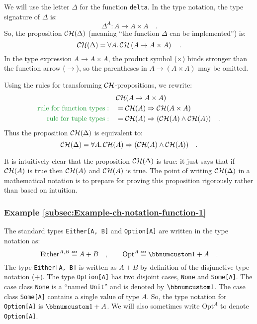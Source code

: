 We will use the letter $\Delta$ for the function \lstinline!delta!.
In the type notation, the type signature of $\Delta$ is:
\[
\Delta^{A}:A\rightarrow A\times A\quad.
\]
So, the proposition ${\cal CH}(\Delta)$ (meaning \textsf{``}the function
$\Delta$ can be implemented\textsf{''}) is:
\[
{\cal CH}(\Delta)=\forall A.{\cal \,CH}\left(A\rightarrow A\times A\right)\quad.
\]
In the type expression $A\rightarrow A\times A$, the product symbol
($\times$) binds stronger than the function arrow ($\rightarrow$),
so the parentheses in $A\rightarrow\left(A\times A\right)$ may be
omitted.

Using the rules for transforming ${\cal CH}$-propositions, we rewrite:
\begin{align*}
 & {\cal CH}(A\rightarrow A\times A)\\
{\color{greenunder}\text{rule for function types}:}\quad & ={\cal CH}(A)\Rightarrow{\cal CH}(A\times A)\\
{\color{greenunder}\text{rule for tuple types}:}\quad & ={\cal CH}(A)\Rightarrow\left({\cal CH}(A)\wedge{\cal CH}(A)\right)\quad.
\end{align*}
Thus the proposition ${\cal CH}(\Delta)$ is equivalent to:
\[
{\cal CH}(\Delta)=\forall A.\,{\cal CH}(A)\Rightarrow({\cal CH}(A)\wedge{\cal CH}(A))\quad.
\]

It is intuitively clear that the proposition ${\cal CH}(\Delta)$
is true: it just says that if ${\cal CH}(A)$ is true then ${\cal CH}(A)$
and ${\cal CH}(A)$ is true. The point of writing ${\cal CH}(\Delta)$
in a mathematical notation is to prepare for proving this proposition
rigorously rather than based on intuition.

\subsubsection{Example \label{subsec:Example-ch-notation-function-1}\ref{subsec:Example-ch-notation-function-1}}

The standard types \lstinline!Either[A, B]! and \lstinline!Option[A]!
are written in the type notation as:
\[
\text{Either}^{A,B}\triangleq A+B\quad,\quad\quad\text{Opt}^{A}\triangleq\bbnum 1+A\quad.
\]
The type \lstinline!Either[A, B]! is written as $A+B$ by definition
of the disjunctive type notation ($+$). The type \lstinline!Option[A]!
has two disjoint cases, \lstinline!None! and \lstinline!Some[A]!.
The case class \lstinline!None! is a \textsf{``}named
\lstinline!Unit!\textsf{''} and is denoted by $\bbnum 1$. The case class
\lstinline!Some[A]! contains a single value of type $A$. So, the
type notation for \lstinline!Option[A]! is $\bbnum 1+A$. We will
also sometimes write $\text{Opt}^{A}$ to denote \lstinline!Option[A]!.

